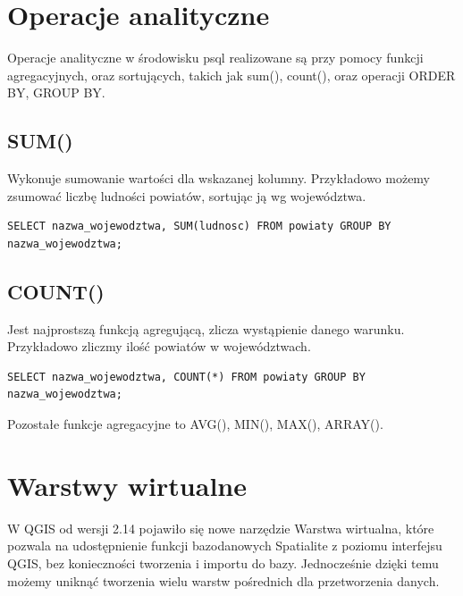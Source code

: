 \documentclass[12pt,a4paper]{book}
\begin{document}
\section{Operacje analityczne}
Operacje analityczne w środowisku psql realizowane są przy pomocy funkcji agregacyjnych, oraz sortujących, takich jak sum(), count(), oraz operacji ORDER BY, GROUP BY.

\subsection{SUM()}
Wykonuje sumowanie wartości dla wskazanej kolumny. Przykładowo możemy zsumować liczbę ludności powiatów, sortując ją wg województwa.

\begin{verbatim}
SELECT nazwa_wojewodztwa, SUM(ludnosc) FROM powiaty GROUP BY nazwa_wojewodztwa;
\end{verbatim}
\subsection{COUNT()}
Jest najprostszą funkcją agregującą, zlicza wystąpienie danego warunku. Przykładowo zliczmy ilość powiatów w województwach.

\begin{verbatim}
SELECT nazwa_wojewodztwa, COUNT(*) FROM powiaty GROUP BY nazwa_wojewodztwa;
\end{verbatim}
Pozostałe funkcje agregacyjne to AVG(), MIN(), MAX(), ARRAY().

\section{Warstwy wirtualne}
W QGIS od wersji 2.14 pojawiło się nowe narzędzie Warstwa wirtualna, które pozwala na udostępnienie funkcji bazodanowych Spatialite z poziomu interfejsu QGIS, bez konieczności tworzenia i importu do bazy. Jednocześnie dzięki temu możemy uniknąć tworzenia wielu warstw pośrednich dla przetworzenia danych.
\end{document}

